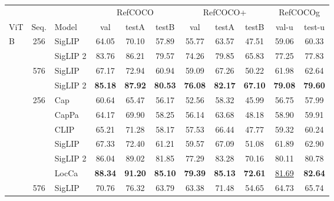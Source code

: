 \begin{tabular}{lclcccccccc}
\toprule
 &  &  & \multicolumn{3}{c}{RefCOCO} & \multicolumn{3}{c}{RefCOCO+} & \multicolumn{2}{c}{RefCOCOg} \\
\cmidrule(lr){4-6} \cmidrule(lr){7-9} \cmidrule(lr){10-11}
 ViT &  Seq. & Model & val & testA & testB & val & testA & testB & val-u & test-u \\
\midrule
\multirow[c]{4}{*}{B} & \multirow[c]{2}{*}{256} & SigLIP \cite{siglip} & 64.05 & 70.10 & 57.89 & 55.77 & 63.57 & 47.51 & 59.06 & 60.33 \\
 &  & \cellcolor{gray!15}SigLIP 2 & \cellcolor{gray!15}83.76 & \cellcolor{gray!15}86.21 & \cellcolor{gray!15}79.57 & \cellcolor{gray!15}74.26 & \cellcolor{gray!15}79.85 & \cellcolor{gray!15}65.83 & \cellcolor{gray!15}77.25 & \cellcolor{gray!15}77.83 \\
\arrayrulecolor{lightgray}\hhline{|~|----------|}
 & \multirow[c]{2}{*}{576} & SigLIP \cite{siglip} & 67.17 & 72.94 & 60.94 & 59.09 & 67.26 & 50.22 & 61.98 & 62.64 \\
 &  & \cellcolor{gray!15}SigLIP 2 & \cellcolor{gray!15}\bf{85.18} & \cellcolor{gray!15}\bf{87.92} & \cellcolor{gray!15}\bf{80.53} & \cellcolor{gray!15}\bf{76.08} & \cellcolor{gray!15}\bf{82.17} & \cellcolor{gray!15}\bf{67.10} & \cellcolor{gray!15}\bf{79.08} & \cellcolor{gray!15}\bf{79.60} \\
\arrayrulecolor{black}\hhline{|-----------|} 
\multirow[c]{8}{*}{L} & \multirow[c]{6}{*}{256} & Cap \cite{cappa} & 60.64 & 65.47 & 56.17 & 52.56 & 58.32 & 45.99 & 56.75 & 57.99 \\
 &  & CapPa \cite{cappa} & 64.17 & 69.90 & 58.25 & 56.14 & 63.68 & 48.18 & 58.90 & 59.91 \\
 &  & CLIP \cite{clip} & 65.21 & 71.28 & 58.17 & 57.53 & 66.44 & 47.77 & 59.32 & 60.24 \\
 &  & SigLIP \cite{siglip} & 67.33 & 72.40 & 61.21 & 59.57 & 67.09 & 51.08 & 61.89 & 62.90 \\
 &  & \cellcolor{gray!15}SigLIP 2 & \cellcolor{gray!15}86.04 & \cellcolor{gray!15}89.02 & \cellcolor{gray!15}81.85 & \cellcolor{gray!15}77.29 & \cellcolor{gray!15}83.28 & \cellcolor{gray!15}70.16 & \cellcolor{gray!15}80.11 & \cellcolor{gray!15}80.78 \\
 &  & LocCa \cite{locca} & \bf{88.34} & \bf{91.20} & \bf{85.10} & \bf{79.39} & \bf{85.13} & \bf{72.61} & \underline{81.69} & \bf{82.64} \\
\arrayrulecolor{lightgray}\hhline{|~|----------|}
 & \multirow[c]{2}{*}{576} & SigLIP \cite{siglip} & 70.76 & 76.32 & 63.79 & 63.38 & 71.48 & 54.65 & 64.73 & 65.74 \\

\end{tabular}
